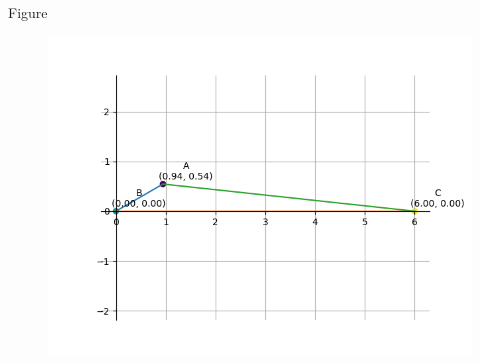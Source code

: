 \documentclass{beamer}
\begin{document}
\begin{frame}{Figure}
    \begin{figure}[h!]
    \centering
    \includegraphics[height=0.6\textheight, keepaspectratio]{figs/fig.png}
    \label{figure_1}
\end{figure}
\end{frame}
\end{document}
